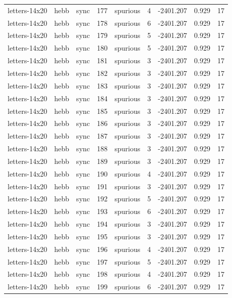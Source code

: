 \begin{tabular}{lllrlrrrr}
letters-14x20 & hebb & sync & 177 & spurious & 4 & -2401.207 & 0.929 & 17 \\
letters-14x20 & hebb & sync & 178 & spurious & 6 & -2401.207 & 0.929 & 17 \\
letters-14x20 & hebb & sync & 179 & spurious & 5 & -2401.207 & 0.929 & 17 \\
letters-14x20 & hebb & sync & 180 & spurious & 5 & -2401.207 & 0.929 & 17 \\
letters-14x20 & hebb & sync & 181 & spurious & 3 & -2401.207 & 0.929 & 17 \\
letters-14x20 & hebb & sync & 182 & spurious & 3 & -2401.207 & 0.929 & 17 \\
letters-14x20 & hebb & sync & 183 & spurious & 3 & -2401.207 & 0.929 & 17 \\
letters-14x20 & hebb & sync & 184 & spurious & 3 & -2401.207 & 0.929 & 17 \\
letters-14x20 & hebb & sync & 185 & spurious & 3 & -2401.207 & 0.929 & 17 \\
letters-14x20 & hebb & sync & 186 & spurious & 3 & -2401.207 & 0.929 & 17 \\
letters-14x20 & hebb & sync & 187 & spurious & 3 & -2401.207 & 0.929 & 17 \\
letters-14x20 & hebb & sync & 188 & spurious & 3 & -2401.207 & 0.929 & 17 \\
letters-14x20 & hebb & sync & 189 & spurious & 3 & -2401.207 & 0.929 & 17 \\
letters-14x20 & hebb & sync & 190 & spurious & 4 & -2401.207 & 0.929 & 17 \\
letters-14x20 & hebb & sync & 191 & spurious & 3 & -2401.207 & 0.929 & 17 \\
letters-14x20 & hebb & sync & 192 & spurious & 5 & -2401.207 & 0.929 & 17 \\
letters-14x20 & hebb & sync & 193 & spurious & 6 & -2401.207 & 0.929 & 17 \\
letters-14x20 & hebb & sync & 194 & spurious & 3 & -2401.207 & 0.929 & 17 \\
letters-14x20 & hebb & sync & 195 & spurious & 3 & -2401.207 & 0.929 & 17 \\
letters-14x20 & hebb & sync & 196 & spurious & 4 & -2401.207 & 0.929 & 17 \\
letters-14x20 & hebb & sync & 197 & spurious & 5 & -2401.207 & 0.929 & 17 \\
letters-14x20 & hebb & sync & 198 & spurious & 4 & -2401.207 & 0.929 & 17 \\
letters-14x20 & hebb & sync & 199 & spurious & 6 & -2401.207 & 0.929 & 17 \\

\end{tabular}
